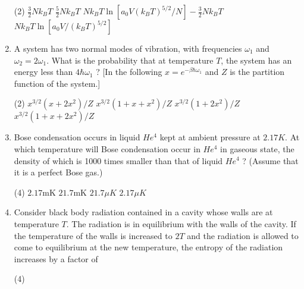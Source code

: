 \begin{enumerate}
\begin{tasks}(2)
\task[\textbf{A.}] $\frac{3}{2} N k_{B} T$
\task[\textbf{B.}] $\frac{5}{2} N k_{B} T$
\task[\textbf{C.}] $N k_{B} T \ln \left[a_{0} V\left(k_{B} T\right)^{5 / 2} / N\right]-\frac{3}{2} N k_{B} T$
\task[\textbf{D.}] $N k_{B} T \ln \left[a_{0} V /\left(k_{B} T\right)^{5 / 2}\right]$
\end{tasks}


\item A system has two normal modes of vibration, with frequencies $\omega_{1}$ and $\omega_{2}=2 \omega_{1} .$ What is the probability that at temperature $T$, the system has an energy less than $4 \hbar \omega_{1}$ ?
[In the following $x=e^{-\beta \hbar \omega_{1}}$ and $Z$ is the partition function of the system.]
{}

\begin{tasks}(2)
\task[\textbf{A.}] $x^{3 / 2}\left(x+2 x^{2}\right) / Z$
\task[\textbf{B.}] $x^{3 / 2}\left(1+x+x^{2}\right) / Z$
\task[\textbf{C.}] $x^{3 / 2}\left(1+2 x^{2}\right) / Z$
\task[\textbf{D.}]  $x^{3 / 2}\left(1+x+2 x^{2}\right) / Z$
\end{tasks}


\item Bose condensation occurs in liquid $H e^{4}$ kept at ambient pressure at $2.17 K$. At which temperature will Bose condensation occur in $H e^{4}$ in gaseous state, the density of which is 1000 times smaller than that of liquid $H e^{4}$ ? (Assume that it is a perfect Bose gas.)
{}

\begin{tasks}(4)
\task[\textbf{A.}] $2.17 \mathrm{mK}$
\task[\textbf{B.}] $21.7 \mathrm{mK}$
\task[\textbf{C.}] $21.7 \mu K$
\task[\textbf{D.}] $2.17 \mu K$
\end{tasks}

\item Consider black body radiation contained in a cavity whose walls are at temperature $T$. The radiation is in equilibrium with the walls of the cavity. If the temperature of the walls is increased to $2 T$ and the radiation is allowed to come to equilibrium at the new temperature, the entropy of the radiation increases by a factor of
{}

\begin{tasks}(4)
\end{tasks}


\end{enumerate}
